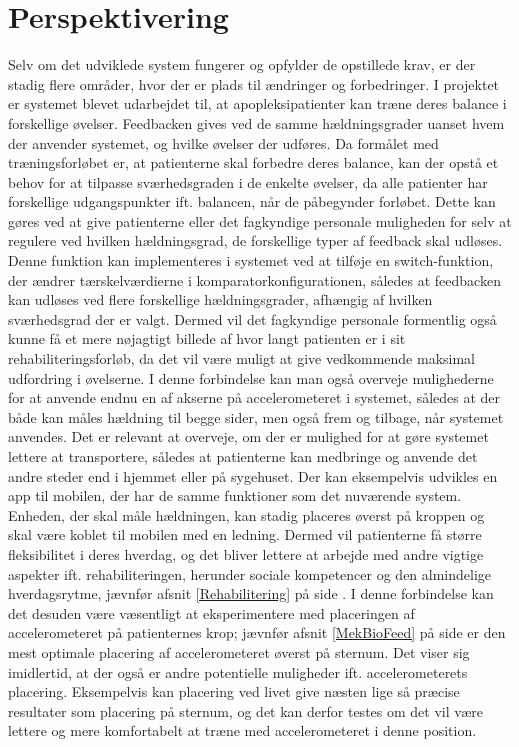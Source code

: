 \section{Perspektivering}
Selv om det udviklede system fungerer og opfylder de opstillede krav, er der stadig flere områder, hvor der er plads til ændringer og forbedringer. 
I projektet er systemet blevet udarbejdet til, at apopleksipatienter kan træne deres balance i forskellige øvelser. Feedbacken gives ved de samme hældningsgrader uanset hvem der anvender systemet, og hvilke øvelser der udføres. Da formålet med træningsforløbet er, at patienterne skal forbedre deres balance, kan der opstå et behov for at tilpasse sværhedsgraden i de enkelte øvelser, da alle patienter har forskellige udgangspunkter ift. balancen, når de påbegynder forløbet. Dette kan gøres ved at give patienterne eller det fagkyndige personale muligheden for selv at regulere ved hvilken hældningsgrad, de forskellige typer af feedback skal udløses. Denne funktion kan implementeres i systemet ved at tilføje en switch-funktion, der ændrer tærskelværdierne i komparatorkonfigurationen, således at feedbacken kan udløses ved flere forskellige hældningsgrader, afhængig af hvilken sværhedsgrad der er valgt. Dermed vil det fagkyndige personale formentlig også kunne få et mere nøjagtigt billede af hvor langt patienten er i sit rehabiliteringsforløb, da det vil være muligt at give vedkommende maksimal udfordring i øvelserne. I denne forbindelse kan man også overveje mulighederne for at anvende endnu en af akserne på accelerometeret i systemet, således at der både kan måles hældning til begge sider, men også frem og tilbage, når systemet anvendes.
Det er relevant at overveje, om der er mulighed for at gøre systemet lettere at transportere, således at patienterne kan medbringe og anvende det andre steder end i hjemmet eller på sygehuset. Der kan eksempelvis udvikles en app til mobilen, der har de samme funktioner som det nuværende system. Enheden, der skal måle hældningen, kan stadig placeres øverst på kroppen og skal være koblet til mobilen med en ledning. Dermed vil patienterne få større fleksibilitet i deres hverdag, og det bliver lettere at arbejde med andre vigtige aspekter ift. rehabiliteringen, herunder sociale kompetencer og den almindelige hverdagsrytme, jævnfør afsnit \ref{Rehabilitering} på side \pageref{Rehabilitering}. I denne forbindelse kan det desuden være væsentligt at eksperimentere med placeringen af accelerometeret på patienternes krop; jævnfør afsnit \ref{MekBioFeed} på side \pageref{MekBioFeed} er den mest optimale placering af accelerometeret øverst på sternum. Det viser sig imidlertid, at der også er andre potentielle muligheder ift. accelerometerets placering. Eksempelvis kan placering ved livet give næsten lige så præcise resultater som placering på sternum, og det kan derfor testes om det vil være lettere og mere komfortabelt at træne med accelerometeret i denne position\cite{Gjoreski2011}.\\
